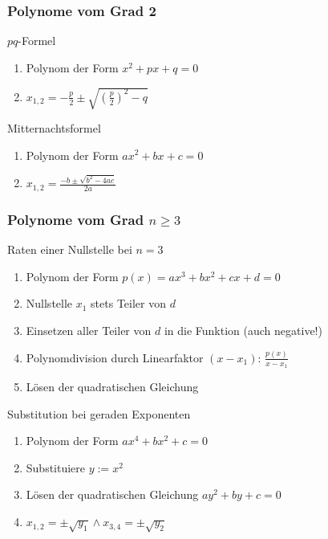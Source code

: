 \documentclass[german]{spicker}
\begin{document}
\subsubsection*{Polynome vom Grad 2}
\begin{halfboxl}
    \vspace{-\baselineskip}
    \begin{algo}{$pq$-Formel}
        \begin{enumerate}
            \item Polynom der Form $x^2 + px + q = 0$
            \item $x_{1,2} = -\frac{p}{2} \pm \sqrt{\left(\frac{p}{2}\right)^2 - q}$
        \end{enumerate}
    \end{algo}
\end{halfboxl}%
\begin{halfboxr}
    \vspace{-\baselineskip}
    \begin{algo}{Mitternachtsformel}
        \begin{enumerate}
            \item Polynom der Form $ax^2 + bx + c = 0$
            \item $x_{1,2} = \frac{-b \pm \sqrt{b^2 - 4ac}}{2a}$
        \end{enumerate}
    \end{algo}
\end{halfboxr}

\subsubsection*{Polynome vom Grad $n \geq 3$}
\begin{algo}{Raten einer Nullstelle bei $n = 3$}
    \begin{enumerate}
        \item Polynom der Form $p(x) = ax^3 + bx^2 + cx + d = 0$
        \item Nullstelle $x_1$ stets Teiler von $d$
        \item Einsetzen aller Teiler von $d$ in die Funktion (auch negative!)
        \item Polynomdivision durch Linearfaktor $(x-x_1)$: $\frac{p(x)}{x - x_1}$
        \item Lösen der quadratischen Gleichung
    \end{enumerate}
\end{algo}

\begin{algo}{Substitution bei geraden Exponenten}
    \begin{enumerate}
        \item Polynom der Form $ax^4 + bx^2 + c = 0$
        \item Substituiere $y := x^2$
        \item Lösen der quadratischen Gleichung $ay^2 + by + c = 0$
        \item $x_{1,2} = \pm \sqrt{y_1} \land x_{3,4} = \pm \sqrt{y_2}$
    \end{enumerate}
\end{algo}
\end{document}
